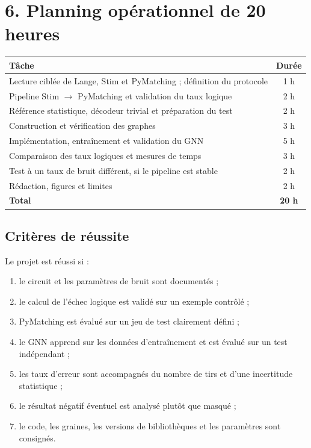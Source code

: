 \documentclass[11pt,a4paper]{article}
\begin{document}
\section{6. Planning opérationnel de 20 heures}

\begin{center}
\begin{tabularx}{\textwidth}{X c}
\toprule
\textbf{Tâche} & \textbf{Durée} \\
\midrule
Lecture ciblée de Lange, Stim et PyMatching ; définition du protocole & 1 h \\
Pipeline Stim $\rightarrow$ PyMatching et validation du taux logique & 2 h \\
Référence statistique, décodeur trivial et préparation du test & 2 h \\
Construction et vérification des graphes & 3 h \\
Implémentation, entraînement et validation du GNN & 5 h \\
Comparaison des taux logiques et mesures de temps & 3 h \\
Test à un taux de bruit différent, si le pipeline est stable & 2 h \\
Rédaction, figures et limites & 2 h \\
\midrule
\textbf{Total} & \textbf{20 h} \\
\bottomrule
\end{tabularx}
\end{center}

\subsection{Critères de réussite}

Le projet est réussi si :
\begin{enumerate}
 \item le circuit et les paramètres de bruit sont documentés ;
 \item le calcul de l'échec logique est validé sur un exemple contrôlé ;
 \item PyMatching est évalué sur un jeu de test clairement défini ;
 \item le GNN apprend sur les données d'entraînement et est évalué sur un
 test indépendant ;
 \item les taux d'erreur sont accompagnés du nombre de tirs et d'une
 incertitude statistique ;
 \item le résultat négatif éventuel est analysé plutôt que masqué ;
 \item le code, les graines, les versions de bibliothèques et les paramètres
 sont consignés.
\end{enumerate}
\end{document}
